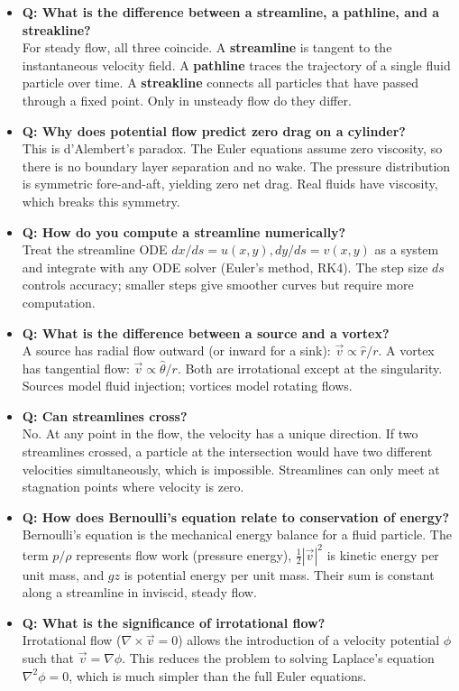 \begin{itemize}
\item \textbf{Q: What is the difference between a streamline, a pathline, and a streakline?} \\
For steady flow, all three coincide. A \textbf{streamline} is tangent to the instantaneous velocity field. A \textbf{pathline} traces the trajectory of a single fluid particle over time. A \textbf{streakline} connects all particles that have passed through a fixed point. Only in unsteady flow do they differ.

\item \textbf{Q: Why does potential flow predict zero drag on a cylinder?} \\
This is d'Alembert's paradox. The Euler equations assume zero viscosity, so there is no boundary layer separation and no wake. The pressure distribution is symmetric fore-and-aft, yielding zero net drag. Real fluids have viscosity, which breaks this symmetry.

\item \textbf{Q: How do you compute a streamline numerically?} \\
Treat the streamline ODE $dx/ds = u(x,y), dy/ds = v(x,y)$ as a system and integrate with any ODE solver (Euler's method, RK4). The step size $ds$ controls accuracy; smaller steps give smoother curves but require more computation.

\item \textbf{Q: What is the difference between a source and a vortex?} \\
A source has radial flow outward (or inward for a sink): $\vec{v} \propto \hat{r}/r$. A vortex has tangential flow: $\vec{v} \propto \hat{\theta}/r$. Both are irrotational except at the singularity. Sources model fluid injection; vortices model rotating flows.

\item \textbf{Q: Can streamlines cross?} \\
No. At any point in the flow, the velocity has a unique direction. If two streamlines crossed, a particle at the intersection would have two different velocities simultaneously, which is impossible. Streamlines can only meet at stagnation points where velocity is zero.

\item \textbf{Q: How does Bernoulli's equation relate to conservation of energy?} \\
Bernoulli's equation is the mechanical energy balance for a fluid particle. The term $p/\rho$ represents flow work (pressure energy), $\frac{1}{2}|\vec{v}|^2$ is kinetic energy per unit mass, and $gz$ is potential energy per unit mass. Their sum is constant along a streamline in inviscid, steady flow.

\item \textbf{Q: What is the significance of irrotational flow?} \\
Irrotational flow ($\nabla \times \vec{v} = 0$) allows the introduction of a velocity potential $\phi$ such that $\vec{v} = \nabla \phi$. This reduces the problem to solving Laplace's equation $\nabla^2 \phi = 0$, which is much simpler than the full Euler equations.
\end{itemize}

